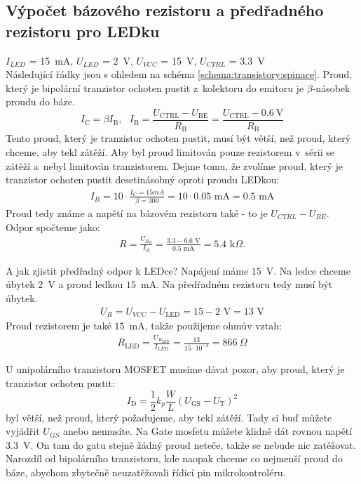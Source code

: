 \documentclass[a4paper,12pt]{article}   %
\begin{document}
\subsection*{Výpočet bázového rezistoru a předřadného rezistoru pro LEDku}
$I_{LED}$ = 15~mA, $U_{LED}$ = 2~V, $U_{VCC}$ = 15~V, $U_{CTRL}$ = 3.3~V\\
Následující řádky jsou s ohledem na schéma \ref{schema:transistory:spinace}. Proud, který je bipolární tranzistor ochoten pustit z~kolektoru do emitoru je $\beta$-násobek proudu do báze.
\begin{equation*}
    I_\text{C} = \beta I_\text{B}, ~~~I_\text{B} = \frac{U_\text{CTRL} - U_\text{BE}}{R_\text{B}} = \frac{U_\text{CTRL} - 0.6~\text{V}}{R_\text{B}}
\end{equation*}
Tento proud, který je tranzistor ochoten pustit, musí být větší, než proud, který chceme, aby tekl zátěží. Aby byl proud limitován pouze rezistorem v~sérii se zátěží a~nebyl limitován tranzistorem. Dejme tomu, že zvolíme proud, který je tranzistor ochoten pustit desetinásobný oproti proudu LEDkou:
\begin{align*}
    I_B = 10 \cdot \frac{I_C = 15 mA}{\beta = 300} = 10\cdot 0.05\text{ mA} = 0.5\text{ mA}
\end{align*}
Proud tedy známe a napětí na bázovém rezistoru také - to je $U_{CTRL} - U_{BE}$. Odpor spočteme jako:
\begin{align*}
    R = \frac{U_{R_B}}{I_B} = \frac{3.3 - 0.6 \text{ V}}{0.5\text{ mA}} = 5.4\text{ k$\Omega$}.
\end{align*}

A jak zjistit předřadný odpor k LEDce? Napájení máme $15$~V. Na ledce chceme úbytek $2$~V a proud ledkou $15$~mA. Na předřadném rezistoru tedy musí být úbytek.
\begin{align*}
    U_R = U_{VCC} - U_{\text{LED}} = 15 - 2\text{ V} = 13\text{ V}
\end{align*}
Proud rezistorem je také $15$~mA, takže použijeme ohmův vztah:
\begin{align*}
    R_\text{LED} = \frac{U_{R_\text{LED}}}{I_{LED}} = \frac{13}{15\cdot 10^{-3}} = 866~\Omega
\end{align*}


U unipolárního tranzistoru MOSFET musíme dávat pozor, aby proud, který je tranzistor ochoten pustit:
\begin{equation*}
    I_\text{D} = \frac{1}{2}k_p \frac{W}{L} (U_\text{GS} - U_\text{T})^2
\end{equation*}
byl větší, než proud, který požadujeme, aby tekl zátěží. Tady si buď můžete vyjádřit $U_{GS}$ anebo nemusíte. Na Gate mosfetu můžete klidně dát rovnou napětí 3.3~V. On tam do gatu stejně žádný proud neteče, takže se nebude nic zatěžovat. Narozdíl od bipolárního tranzistoru, kde naopak chceme co nejmenší proud do báze, abychom zbytečně neuzatěžovali řídicí pin mikrokontroléru.
\end{document}
